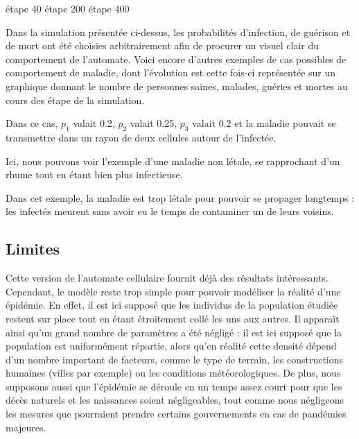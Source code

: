 \documentclass{article}
\begin{document}
	étape 40                                                               étape 200                                                            étape 400



Dans la simulation présentée ci-dessus, les probabilités d'infection, de guérison et de mort ont été choisies arbitrairement afin de procurer un visuel clair du comportement de l'automate. Voici encore d'autres exemples de cas possibles de comportement de maladie, dont l'évolution est cette fois-ci représentée sur un graphique donnant le nombre de personnes saines, malades, guéries et mortes au cours des étape de la simulation.



	\begin{center}

	Dans ce cas, $p_1$ valait 0.2, $p_2$ valait 0.25, $p_3$ valait 0.2 et la maladie pouvait se transmettre dans un rayon de deux cellules autour de l'infectée.

	Ici, nous pouvons voir l'exemple d'une maladie non létale, se rapprochant d'un rhume tout en étant bien plus infectieuse.

Dans cet exemple, la maladie est trop létale pour pouvoir se propager longtemps : les infectés meurent sans avoir eu le temps de contaminer un de leurs voisins.

	\end{center}
\subsection{Limites}
	Cette version de l'automate cellulaire fournit déjà des résultats intéressants. Cependant, le modèle reste trop simple pour pouvoir modéliser la réalité d'une épidémie. En effet, il est ici supposé que les individus de la population étudiée restent sur place tout en étant étroitement collé les uns aux autres.
Il apparaît ainsi qu'un grand nombre de paramètres a été négligé : il est ici supposé que la population est uniformément répartie, alors qu'en réalité cette densité dépend d'un nombre important de facteurs, comme le type de terrain, les constructions humaines (villes par exemple) ou les conditions météorologiques. De plus, nous supposons aussi que l'épidémie se déroule en un temps assez court pour que les décès naturels et les naissances soient négligeables, tout comme nous négligeons les mesures que pourraient prendre certains gouvernements en cas de pandémies majeures.
	
	
	
\end{document}
